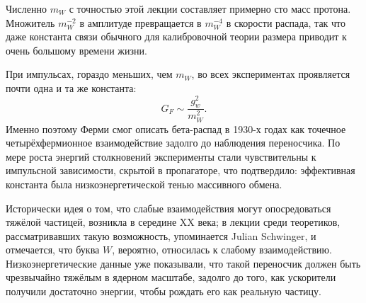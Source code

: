 Численно \(m_W\) с точностью этой лекции составляет примерно сто масс протона. Множитель \(m_W^{-2}\) в амплитуде превращается в \(m_W^{-4}\) в скорости распада, так что даже константа связи обычного для калибровочной теории размера приводит к очень большому времени жизни.

\begin{classroomqa}
\end{classroomqa}

При импульсах, гораздо меньших, чем \(m_W\), во всех экспериментах проявляется почти одна и та же константа:
\begin{equation}
  G_F\sim\frac{g_w^2}{m_W^2}.
\end{equation}
Именно поэтому Ферми смог описать бета-распад в 1930-х годах как точечное четырёхфермионное взаимодействие задолго до наблюдения переносчика. По мере роста энергий столкновений эксперименты стали чувствительны к импульсной зависимости, скрытой в пропагаторе, что подтвердило: эффективная константа была низкоэнергетической тенью массивного обмена.

Исторически идея о том, что слабые взаимодействия могут опосредоваться тяжёлой частицей, возникла в середине XX века; в лекции среди теоретиков, рассматривавших такую возможность, упоминается Julian Schwinger, и отмечается, что буква \(W\), вероятно, относилась к слабому взаимодействию. Низкоэнергетические данные уже показывали, что такой переносчик должен быть чрезвычайно тяжёлым в ядерном масштабе, задолго до того, как ускорители получили достаточно энергии, чтобы рождать его как реальную частицу.

